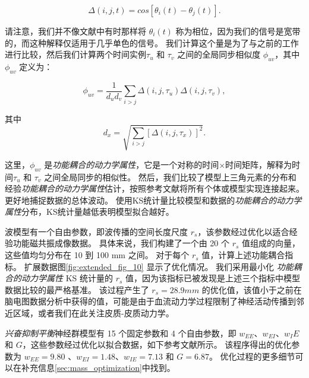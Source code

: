 \documentclass[lang=cn,a4paper,newtx]{elegantpaper}
\begin{document}
\begin{equation}\label{eq:synchrony}
	\Delta(i,j,t) = cos [\theta_i (t) - \theta_j (t)].
\end{equation}

请注意，我们并不像文献中有时那样将 $ \theta_i(t) $ 称为相位，因为我们的信号是宽带的，而这种解释仅适用于几乎单色的信号。
我们计算这个量是为了与之前的工作进行比较\cite{deco2021dynamical,aquino2022intersection}，然后我们计算两个时间实例$ \tau_u $ 和 $ \tau_v $ 之间的全局同步相似度 $ \phi_{uv} $，其中 $ \phi_{uv} $ 定义为：

\begin{equation}\label{eq:synchrony_similarity}
	\phi_{uv} = \frac{1}{d_u d_v} 
				\sum_{i>j} \Delta(i,j,\tau_u) \Delta(i,j,\tau_v),
\end{equation}

其中
\begin{equation}\label{key}
	d_x = \sqrt{\sum_{i>j}
					[
					\Delta(i,j,\tau_x)
					]^2
				}.
\end{equation}

这里，$ \phi_{uv} $ 是\textit{功能耦合的动力学属性}，它是一个对称的时间$ \times $时间矩阵，解释为时间$ \tau_u $ 和 $ \tau_v $ 之间全局同步的相似性。
然后，我们比较了模型上三角元素的分布和经验\textit{功能耦合的动力学属性}估计，按照参考文献将所有个体或模型实现连接起来\cite{aquino2022intersection}。
更好地捕捉数据的总体波动。
使用KS统计量比较模型和数据的\textit{功能耦合的动力学属性}分布，KS统计量越低表明模型拟合越好。


波模型有一个自由参数，即波传播的空间长度尺度 $ r_s $，该参数经过优化以适合经验功能磁共振成像数据。
具体来说，我们构建了一个由 20 个 $ r_s $ 值组成的向量，这些值均匀分布在 10 到 100 mm 之间。
对于每个 $ r_s $ 值，计算上述功能耦合指标。
扩展数据图\ref{fig:extended_fig_10} 显示了优化情况。
我们采用最小化 \textit{功能耦合的动力学属性} KS 统计量的 $ r_s $ 值，因为该指标已被发现是上述三个指标中模型数据比较的最严格基准\cite{aquino2022intersection}。
该过程产生了 $ r_s = 28.9 mm $ 的优化值，该值小于之前在脑电图数据分析中获得的值\cite{robinson2005multiscale}，可能是由于血流动力学过程限制了神经活动传播到邻近区域，或者我们在此关注皮质-皮质动力学\cite{aquino2012hemodynamic,pang2017effects}。


\textit{兴奋抑制平衡}神经群模型有 15 个固定参数和 4 个自由参数，即 $ w_{EE} $、$ w_{EI} $、$ w_IE $ 和 $ G $，这些参数经过优化以拟合数据，如下参考文献\cite{demirtacs2019hierarchical}所示。
该程序得出的优化参数为 $ w_{EE} = 9.80 $ 、$ w_{EI} = 1.48 $、$ w_{IE} = 7.13 $ 和 $ G = 6.87 $。
优化过程的更多细节可以在补充信息\ref{sec:mass_optimization}中找到。
\end{document}
